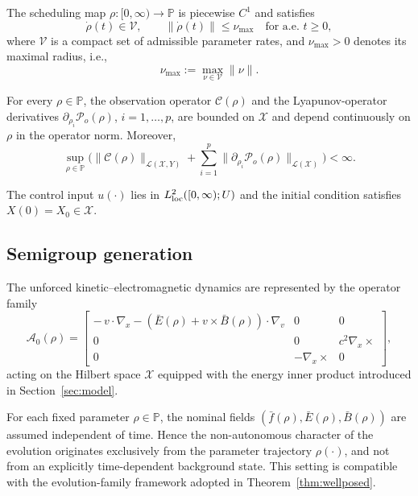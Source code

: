 \documentclass[AMA,Times2COL]{WileyNJDv5}
\begin{document}
\begin{assumption}\label{ass:rho}
The scheduling map $\rho:[0,\infty)\to\mathbb{P}$ is piecewise $C^{1}$ and
satisfies 
\[
\dot\rho(t)\in\mathcal{V},
\qquad 
\|\dot\rho(t)\|\le \nu_{\max}
\quad\text{for a.e. } t\ge 0 ,
\]
where $\mathcal{V}$ is a compact set of admissible parameter rates, and $\nu_{\max}>0$ denotes its maximal radius, i.e.,
\[
\nu_{\max}:=\max_{\nu\in\mathcal{V}}\|\nu\|.
\]
\end{assumption}

\begin{assumption}
\label{ass:bounded-families}
For every $\rho\in\mathbb{P}$, the observation operator
$\mathcal{C}(\rho)$ and the Lyapunov-operator derivatives
$\partial_{\rho_i}\mathcal{P}_o(\rho)$, $i=1,\dots,p$, are bounded on $\mathscr{X}$ and depend continuously on $\rho$ in the operator norm.
Moreover,
\[
\sup_{\rho\in\mathbb{P}}
\Big(
\|\mathcal{C}(\rho)\|_{\mathcal{L}(\mathscr{X},Y)}
+
\sum_{i=1}^{p}
\|\partial_{\rho_i}\mathcal{P}_o(\rho)\|_{\mathcal{L}(\mathscr{X})}
\Big)<\infty .
\]
\end{assumption}

\begin{assumption}\label{ass:init}
The control input $u(\cdot)$ lies in $L^2_{\rm loc}([0,\infty);U)$ and the initial condition satisfies $X(0)=X_0\in\mathscr{X}$.
\end{assumption}

\subsection{Semigroup generation}

The unforced kinetic--electromagnetic dynamics are represented by the operator family
\begin{equation}\label{eq:opA_0}
\mathcal{A}_0(\rho)=
\begin{bmatrix}
-\,v\!\cdot\!\nabla_x
-
(\bar E(\rho)+v\times\bar B(\rho))\!\cdot\!\nabla_v

& 0 & 0\\[0.2em]
0 & 0 & c^2\nabla_x\times\\[0.2em]
0 & -\nabla_x\times & 0
\end{bmatrix},
\end{equation}
acting on the Hilbert space
\(
\mathscr X
\)
equipped with the energy inner product introduced in
Section~\ref{sec:model}.

For each fixed parameter \(\rho\in\mathbb P\), the nominal fields
\(
(\bar f(\rho),\bar E(\rho),\bar B(\rho))
\)
are assumed independent of time. Hence the non-autonomous character of the evolution originates exclusively from the parameter trajectory \(\rho(\cdot)\), and not from an explicitly time-dependent background state.
This setting is compatible with the evolution-family framework adopted in Theorem~\ref{thm:wellposed}.
\end{document}
